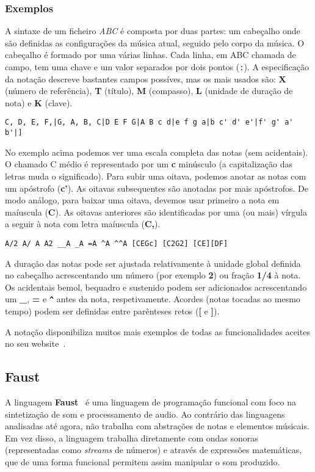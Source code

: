     \subsubsection{Exemplos}
A sintaxe de um ficheiro \textit{ABC} é composta por duas partes: um cabeçalho onde são definidas as configurações da música atual, seguido pelo corpo da música. O cabeçalho é formado por uma várias linhas. Cada linha, em ABC chamada de campo, tem uma chave e um valor separados por dois pontos (\texttt{:}). A especificação da notação descreve bastantes campos possíves, mas os mais usados são: \textbf{X} (número de referência), \textbf{T} (título), \textbf{M} (compasso), \textbf{L} (unidade de duração de nota) e \textbf{K} (clave).

\begin{lstlisting}[caption={Exemplo da notação ABC}]
C, D, E, F,|G, A, B, C|D E F G|A B c d|e f g a|b c' d' e'|f' g' a' b'|]
\end{lstlisting}

No exemplo acima podemos ver uma escala completa das notas (sem acidentais). O chamado C médio é representado por um \textbf{c} minúsculo (a capitalização das letras muda o significado). Para subir uma oitava, podemos anotar as notas com um apóstrofo (\textbf{c'}). As oitavas subsequentes são anotadas por mais apóstrofos. De modo análogo, para baixar uma oitava, devemos usar primeiro a nota em maíuscula (\textbf{C}). As oitavas anteriores são identificadas por uma (ou mais) vírgula a seguir à nota com letra maíuscula (\textbf{C,}).


\begin{lstlisting}[caption={Exemplo da notação ABC}]
A/2 A/ A A2 __A _A =A ^A ^^A [CEGc] [C2G2] [CE][DF]
\end{lstlisting}
A duração das notas pode ser ajustada relativamente à unidade global definida no cabeçalho acrescentando um número (por exemplo \textbf{2}) ou fração \textbf{1/4} à nota. Os acidentais bemol, bequadro e sustenido podem ser adicionados acrescentando um \textbf{\_}, \textbf{=} e \textbf{\texttt{\textasciicircum{}}} antes da nota, respetivamente. Acordes (notas tocadas ao mesmo tempo) podem ser definidas entre parênteses retos (\textbf{[} e \textbf{]}).

A notação disponibiliza muitos mais exemplos de todas as funcionalidades aceites no seu website~\cite{abc-notation-examples}.

\subsection{Faust}
A linguagem \textbf{Faust}~\cite{orlarey:Faust, faust, orlarey:hal-02158894} é uma linguagem de programação funcional com foco na sintetização de som e processamento de audio. Ao contrário das linguagens analisadas até agora, não trabalha com abstrações de notas e elementos músicais. Em vez disso, a linguagem trabalha diretamente com ondas sonoras (representadas como \textit{streams} de números) e através de expressões matemáticas, que de uma forma funcional permitem assim manipular o som produzido.

